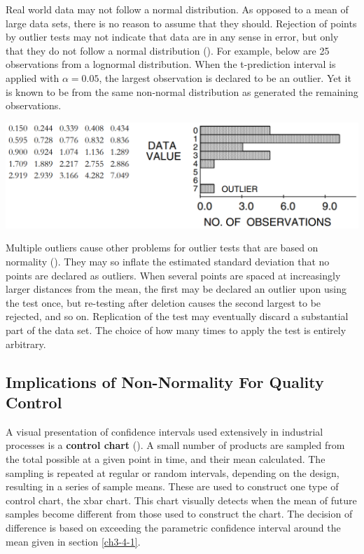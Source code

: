 \documentclass[]{book}
\begin{document}
Real world data may not follow a normal distribution. As opposed to a mean of large data sets, there is no reason to assume that they should. Rejection of points by outlier tests may not indicate that data are in any sense in error, but only that they do not follow a normal distribution (\citet{fisher_mathematical_1922}). For example, below are 25 observations from a lognormal distribution. When the t-prediction interval is applied with \(\alpha = 0.05\), the largest observation is declared to be an outlier. Yet it is known to be from the same non-normal distribution as generated the remaining observations.

\begin{center}\includegraphics[width=16.49in]{figures/3_E} \end{center}

Multiple outliers cause other problems for outlier tests that are based on normality (\citet{beckman_outlier_1983}). They may so inflate the estimated standard deviation that no points are declared as outliers. When several points are spaced at increasingly larger distances from the mean, the first may be declared an outlier upon using the test once, but re-testing after deletion causes the second largest to be rejected, and so on. Replication of the test may eventually discard a substantial part of the data set. The choice of how many times to apply the test is entirely arbitrary.

\hypertarget{implications-of-non-normality-for-quality-control}{%
\subsection{Implications of Non-Normality For Quality Control}\label{implications-of-non-normality-for-quality-control}}

A visual presentation of confidence intervals used extensively in industrial processes is a \textbf{control chart} (\citet{montgomery_introduction_1991}). A small number of products are sampled from the total possible at a given point in time, and their mean calculated. The sampling is repeated at regular or random intervals, depending on the design, resulting in a series of sample means. These are used to construct one type of control chart, the xbar chart. This chart visually detects when the mean of future samples become different from those used to construct the chart. The decision of difference is based on exceeding the parametric confidence interval around the mean given in section \ref{ch3-4-1}.
\end{document}
